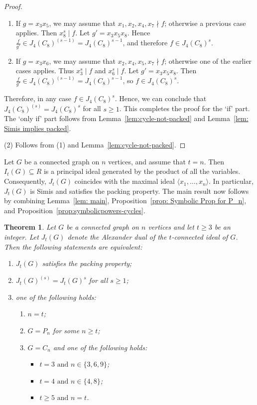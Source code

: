 \documentclass[12pt]{amsart}
\newtheorem{theorem}[proposition]{Theorem}
\def\l{\langle}
\def\r{\rangle}
\begin{document}
\begin{proof}
\begin{enumerate}
\item If $g = x_3x_5$, we may assume that
$x_1,x_2,x_4,x_7 \nmid f$; otherwise a previous case applies.
Then $x_8^s \mid f$.
Let $g' = x_3x_5x_8$. Hence
$\frac{f}{g'} \in J_4(C_8)^{(s-1)} = J_4(C_8)^{s-1}$,
and therefore $f \in J_4(C_8)^s$.

\item If $g = x_3x_6$, we may assume that
$x_2,x_4,x_5,x_7 \nmid f$; otherwise one of the earlier cases applies.
Thus $x_3^s \mid f$ and $x_6^s \mid f$.
Let $g' = x_3x_5x_8$. Then
$\frac{f}{g'} \in J_4(C_8)^{(s-1)} = J_4(C_8)^{s-1}$,
so $f \in J_4(C_8)^s$.

\end{enumerate}
Therefore, in any case $f\in J_4(C_8)^s$. Hence, we can conclude that $J_4(C_8)^{(s)} = J_4(C_8)^s$ for all $s \ge 1$. This completes the proof for the `if' part. The `only if' part follows from Lemma~\ref{lem:cycle-not-packed}
and Lemma~\ref{lem: Simis implies packed}.

\medskip 
\noindent
(2) Follows from (1) and Lemma~\ref{lem:cycle-not-packed}.
\end{proof}


Let $G$ be a connected graph on $n$ vertices, and assume that $t = n$. Then $I_t(G) \subseteq R$ is a principal ideal generated by the product of all the variables. Consequently, $J_t(G)$ coincides with the maximal ideal $\l x_1,\dots , x_n\r$. In particular, $J_t(G)$ is Simis and satisfies the packing property.  The main result now follows by combining Lemma~\ref{lem: main}, Proposition~\ref{prop: Symbolic Prop for P_n}, and Proposition~\ref{prop:symbolicpowers-cycles}.



\begin{theorem}\label{thm: main}
    Let $G$ be a connected graph on $n$ vertices and let $t\geq 3$ be an integer. Let $J_t(G)$ denote the Alexander dual of the $t$-connected ideal of $G$. Then the following statements are equivalent:
    \begin{enumerate}
        \item $J_t(G)$ satisfies the packing property;
        \item $J_t(G)^{(s)}=J_t(G)^s$ for all $s\geq 1$;
        \item one of the following holds:
        \begin{enumerate}
            \item[(a)] $n=t$;
            \item[(b)] $G=P_n$ for some $n\geq t$;
            \item[(c)] $G=C_n$ and one of the following holds: \begin{itemize}
            \item[(i)] $t=3 \text{ and } n\in \{3,6,9\}$;
            \item[(ii)] $t=4 \text{ and } n\in \{4,8\}$;
            \item[(iii)] $t\geq 5 \text{ and } n=t$.
        \end{itemize}
        \end{enumerate}        
    \end{enumerate}
\end{theorem}
\end{document}

